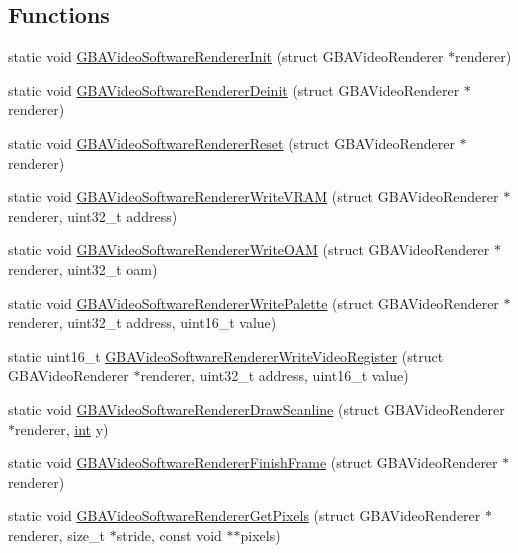 \subsection*{Functions}
\begin{DoxyCompactItemize}
\item 
static void \mbox{\hyperlink{video-software_8c_af96caae6a353b68c77615b83bfee10cb}{G\+B\+A\+Video\+Software\+Renderer\+Init}} (struct G\+B\+A\+Video\+Renderer $\ast$renderer)
\item 
static void \mbox{\hyperlink{video-software_8c_ac2c59bbe64e1453e725a61a739187a6b}{G\+B\+A\+Video\+Software\+Renderer\+Deinit}} (struct G\+B\+A\+Video\+Renderer $\ast$renderer)
\item 
static void \mbox{\hyperlink{video-software_8c_ad9b2accf87f8b85ec8976ac94bc5b6d1}{G\+B\+A\+Video\+Software\+Renderer\+Reset}} (struct G\+B\+A\+Video\+Renderer $\ast$renderer)
\item 
static void \mbox{\hyperlink{video-software_8c_aa5af01915ee7706cdbf55fd4295192f6}{G\+B\+A\+Video\+Software\+Renderer\+Write\+V\+R\+AM}} (struct G\+B\+A\+Video\+Renderer $\ast$renderer, uint32\+\_\+t address)
\item 
static void \mbox{\hyperlink{video-software_8c_a3e1a51d28182f9f3b3e2db089e275e2a}{G\+B\+A\+Video\+Software\+Renderer\+Write\+O\+AM}} (struct G\+B\+A\+Video\+Renderer $\ast$renderer, uint32\+\_\+t oam)
\item 
static void \mbox{\hyperlink{video-software_8c_acc8c3b30451a006f57fbfd75bc9582b7}{G\+B\+A\+Video\+Software\+Renderer\+Write\+Palette}} (struct G\+B\+A\+Video\+Renderer $\ast$renderer, uint32\+\_\+t address, uint16\+\_\+t value)
\item 
static uint16\+\_\+t \mbox{\hyperlink{video-software_8c_abf56bee96b521193690fc647929cd43b}{G\+B\+A\+Video\+Software\+Renderer\+Write\+Video\+Register}} (struct G\+B\+A\+Video\+Renderer $\ast$renderer, uint32\+\_\+t address, uint16\+\_\+t value)
\item 
static void \mbox{\hyperlink{video-software_8c_a114a0223dfad6a2dcb0ad90c763ca781}{G\+B\+A\+Video\+Software\+Renderer\+Draw\+Scanline}} (struct G\+B\+A\+Video\+Renderer $\ast$renderer, \mbox{\hyperlink{ioapi_8h_a787fa3cf048117ba7123753c1e74fcd6}{int}} y)
\item 
static void \mbox{\hyperlink{video-software_8c_ab3f71de0216af2e138ddf948622ffc2f}{G\+B\+A\+Video\+Software\+Renderer\+Finish\+Frame}} (struct G\+B\+A\+Video\+Renderer $\ast$renderer)
\item 
static void \mbox{\hyperlink{video-software_8c_a1f3ab2c0fe8d2b4179230c474a0e8ee8}{G\+B\+A\+Video\+Software\+Renderer\+Get\+Pixels}} (struct G\+B\+A\+Video\+Renderer $\ast$renderer, size\+\_\+t $\ast$stride, const void $\ast$$\ast$pixels)
$$
\end{DoxyCompactItemize}
